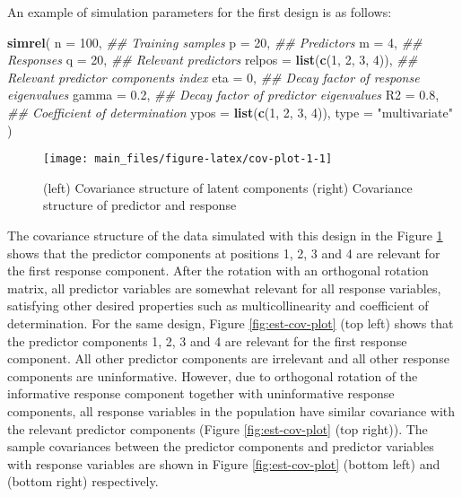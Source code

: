 \documentclass[review]{elsarticle}
\newenvironment{Shaded}{\begin{snugshade}}{\end{snugshade}}
\newcommand{\CommentTok}[1]{\textcolor[rgb]{0.56,0.35,0.01}{\textit{#1}}}
\newcommand{\DataTypeTok}[1]{\textcolor[rgb]{0.13,0.29,0.53}{#1}}
\newcommand{\DecValTok}[1]{\textcolor[rgb]{0.00,0.00,0.81}{#1}}
\newcommand{\FloatTok}[1]{\textcolor[rgb]{0.00,0.00,0.81}{#1}}
\newcommand{\KeywordTok}[1]{\textcolor[rgb]{0.13,0.29,0.53}{\textbf{#1}}}
\newcommand{\NormalTok}[1]{#1}
\newcommand{\StringTok}[1]{\textcolor[rgb]{0.31,0.60,0.02}{#1}}
\begin{document}
An example of simulation parameters for the first design is as follows:

\begin{Shaded}
\begin{Highlighting}[]
\KeywordTok{simrel}\NormalTok{(}
    \DataTypeTok{n       =} \DecValTok{100}\NormalTok{,                 }\CommentTok{## Training samples}
    \DataTypeTok{p       =} \DecValTok{20}\NormalTok{,                  }\CommentTok{## Predictors}
    \DataTypeTok{m       =} \DecValTok{4}\NormalTok{,                   }\CommentTok{## Responses}
    \DataTypeTok{q       =} \DecValTok{20}\NormalTok{,                  }\CommentTok{## Relevant predictors}
    \DataTypeTok{relpos  =} \KeywordTok{list}\NormalTok{(}\KeywordTok{c}\NormalTok{(}\DecValTok{1}\NormalTok{, }\DecValTok{2}\NormalTok{, }\DecValTok{3}\NormalTok{, }\DecValTok{4}\NormalTok{)), }\CommentTok{## Relevant predictor components index}
    \DataTypeTok{eta     =} \DecValTok{0}\NormalTok{,                   }\CommentTok{## Decay factor of response eigenvalues}
    \DataTypeTok{gamma   =} \FloatTok{0.2}\NormalTok{,                 }\CommentTok{## Decay factor of predictor eigenvalues}
    \DataTypeTok{R2      =} \FloatTok{0.8}\NormalTok{,                 }\CommentTok{## Coefficient of determination}
    \DataTypeTok{ypos    =} \KeywordTok{list}\NormalTok{(}\KeywordTok{c}\NormalTok{(}\DecValTok{1}\NormalTok{, }\DecValTok{2}\NormalTok{, }\DecValTok{3}\NormalTok{, }\DecValTok{4}\NormalTok{)),}
    \DataTypeTok{type    =} \StringTok{"multivariate"}
\NormalTok{)}
\end{Highlighting}
\end{Shaded}

\begin{figure}
\texttt{[image: main\_files/figure-latex/cov-plot-1-1]} \caption{(left) Covariance structure of latent components (right) Covariance structure of predictor and response}\label{fig:cov-plot-1}
\end{figure}

The covariance structure of the data simulated with this design in the Figure \ref{fig:cov-plot-1} shows that the predictor components at positions 1, 2, 3 and 4 are relevant for the first response component. After the rotation with an orthogonal rotation matrix, all predictor variables are somewhat relevant for all response variables, satisfying other desired properties such as multicollinearity and coefficient of determination. For the same design, Figure \ref{fig:est-cov-plot} (top left) shows that the predictor components 1, 2, 3 and 4 are relevant for the first response component. All other predictor components are irrelevant and all other response components are uninformative. However, due to orthogonal rotation of the informative response component together with uninformative response components, all response variables in the population have similar covariance with the relevant predictor components (Figure \ref{fig:est-cov-plot} (top right)). The sample covariances between the predictor components and predictor variables with response variables are shown in Figure \ref{fig:est-cov-plot} (bottom left) and (bottom right) respectively.
\end{document}
